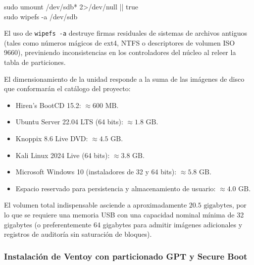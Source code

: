 \documentclass[12pt]{article}
\begin{document}
\begin{mdframed}[style=terminal]
\ttfamily\upshape\color{bashLetterColor}\footnotesize
sudo umount /dev/sdb* 2>/dev/null || true \\
sudo wipefs -a /dev/sdb
\end{mdframed}

El uso de \texttt{wipefs -a} destruye firmas residuales de sistemas de archivos antiguos (tales como números mágicos de ext4, NTFS o descriptores de volumen ISO 9660), previniendo inconsistencias en los controladores del núcleo al releer la tabla de particiones.

El dimensionamiento de la unidad responde a la suma de las imágenes de disco que conformarán el catálogo del proyecto:
\begin{itemize}[noitemsep, topsep=2pt]
    \item Hiren's BootCD 15.2: $\approx 600 \text{ MB}$.
    \item Ubuntu Server 22.04 LTS (64 bits): $\approx 1.8 \text{ GB}$.
    \item Knoppix 8.6 Live DVD: $\approx 4.5 \text{ GB}$.
    \item Kali Linux 2024 Live (64 bits): $\approx 3.8 \text{ GB}$.
    \item Microsoft Windows 10 (instaladores de 32 y 64 bits): $\approx 5.8 \text{ GB}$.
    \item Espacio reservado para persistencia y almacenamiento de usuario: $\approx 4.0 \text{ GB}$.
\end{itemize}

El volumen total indispensable asciende a aproximadamente $20.5 \text{ gigabytes}$, por lo que se requiere una memoria USB con una capacidad nominal mínima de 32 gigabytes (o preferentemente 64 gigabytes para admitir imágenes adicionales y registros de auditoría sin saturación de bloques).

\subsubsection{Instalación de Ventoy con particionado GPT y Secure Boot}
\end{document}
